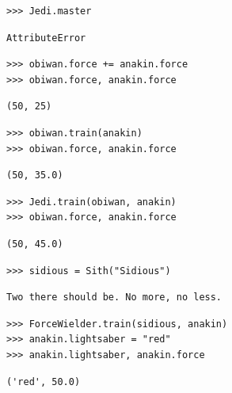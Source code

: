 \begin{lstlisting}
>>> Jedi.master
\end{lstlisting}
\begin{solution}[.2in]
\begin{lstlisting}
AttributeError
\end{lstlisting}
\end{solution}

\begin{lstlisting}
>>> obiwan.force += anakin.force
>>> obiwan.force, anakin.force
\end{lstlisting}
\begin{solution}[.2in]
\begin{lstlisting}
(50, 25)
\end{lstlisting}
\end{solution}

\begin{lstlisting}
>>> obiwan.train(anakin)
>>> obiwan.force, anakin.force
\end{lstlisting}
\begin{solution}[.2in]
\begin{lstlisting}
(50, 35.0)
\end{lstlisting}
\end{solution}

\begin{lstlisting}
>>> Jedi.train(obiwan, anakin)
>>> obiwan.force, anakin.force
\end{lstlisting}
\begin{solution}[.2in]
\begin{lstlisting}
(50, 45.0)
\end{lstlisting}
\end{solution}

\begin{lstlisting}
>>> sidious = Sith("Sidious")
\end{lstlisting}
\begin{solution}[.2in]
\begin{lstlisting}
Two there should be. No more, no less.
\end{lstlisting}
\end{solution}

\begin{lstlisting}
>>> ForceWielder.train(sidious, anakin)
>>> anakin.lightsaber = "red"
>>> anakin.lightsaber, anakin.force
\end{lstlisting}
\begin{solution}[.2in]
\begin{lstlisting}
('red', 50.0)
\end{lstlisting}
\end{solution}

